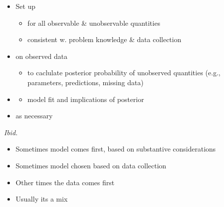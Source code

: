 \documentclass[10pt]{report}
\begin{document}
% 
\begin{itemize}
\item Set up 
  \vspace*{-4pt}
  \begin{itemize}
  \item for all observable \& unobservable quantities
  \item consistent w. problem knowledge \& data collection
  \end{itemize}
\item {} on observed data
  \vspace*{-4pt}
  \begin{itemize}
  \item to caclulate posterior probability of unobserved quantities
    (e.g., parameters, predictions, missing data)
  \end{itemize}
\item {}
  \vspace*{-4pt}
  \begin{itemize}
  \item model fit and implications of posterior
  \end{itemize}
\vfill
\item {} as necessary
\end{itemize}

\vfill\hfill {\footnotesize {\slshape Ibid.}}

\begin{itemize}
\item Sometimes model comes first, based on substantive
  considerations
\item Sometimes model chosen based on data collection
\item Other times the data comes first
\hfill
\item Usually its a mix
\end{itemize}
\end{document}
